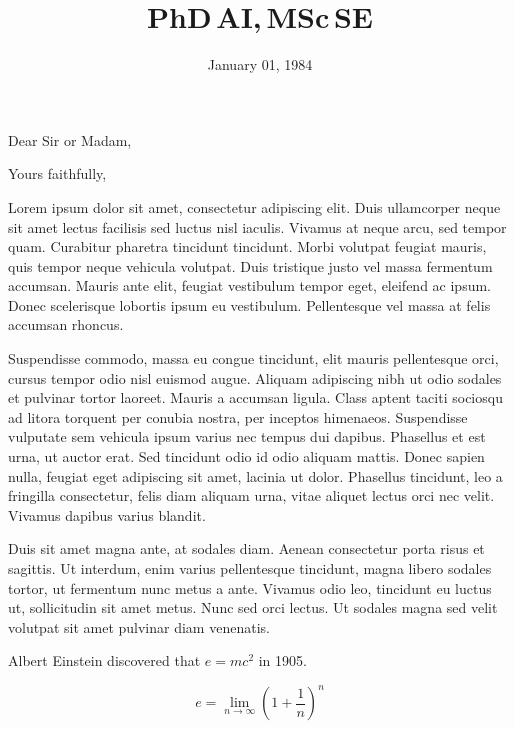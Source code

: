 \documentclass[11pt,a4paper,sans]{moderncv}
\title{PhD{\smaller[2]\,AI},\,MSc{\smaller[2]\,SE}}
\begin{document}
\date{January 01, 1984}
\opening{Dear Sir or Madam,}
\closing{Yours faithfully,}
\makelettertitle

Lorem ipsum dolor sit amet, consectetur adipiscing elit. Duis ullamcorper neque sit amet lectus facilisis sed luctus nisl iaculis. Vivamus at neque arcu, sed tempor quam. Curabitur pharetra tincidunt tincidunt. Morbi volutpat feugiat mauris, quis tempor neque vehicula volutpat. Duis tristique justo vel massa fermentum accumsan. Mauris ante elit, feugiat vestibulum tempor eget, eleifend ac ipsum. Donec scelerisque lobortis ipsum eu vestibulum. Pellentesque vel massa at felis accumsan rhoncus.

Suspendisse commodo, massa eu congue tincidunt, elit mauris pellentesque orci, cursus tempor odio nisl euismod augue. Aliquam adipiscing nibh ut odio sodales et pulvinar tortor laoreet. Mauris a accumsan ligula. Class aptent taciti sociosqu ad litora torquent per conubia nostra, per inceptos himenaeos. Suspendisse vulputate sem vehicula ipsum varius nec tempus dui dapibus. Phasellus et est urna, ut auctor erat. Sed tincidunt odio id odio aliquam mattis. Donec sapien nulla, feugiat eget adipiscing sit amet, lacinia ut dolor. Phasellus tincidunt, leo a fringilla consectetur, felis diam aliquam urna, vitae aliquet lectus orci nec velit. Vivamus dapibus varius blandit.

Duis sit amet magna ante, at sodales diam. Aenean consectetur porta risus et sagittis. Ut interdum, enim varius pellentesque tincidunt, magna libero sodales tortor, ut fermentum nunc metus a ante. Vivamus odio leo, tincidunt eu luctus ut, sollicitudin sit amet metus. Nunc sed orci lectus. Ut sodales magna sed velit volutpat sit amet pulvinar diam venenatis.

Albert Einstein discovered that $e=mc^2$ in 1905.

\[ e=\lim_{n \to \infty} \left(1+\frac{1}{n}\right)^n \]

\makeletterclosing

\clearpage






\makecvtitle
\end{document}
